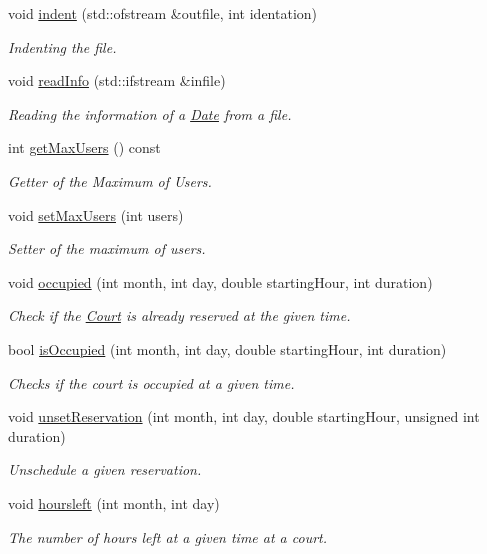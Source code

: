 \begin{DoxyCompactItemize}
void \mbox{\hyperlink{class_court_ae08f3e2f1119073fffc251fc1e725550}{indent}} (std\+::ofstream \&outfile, int identation)
\begin{DoxyCompactList}\small\item\em Indenting the file. \end{DoxyCompactList}\item 
void \mbox{\hyperlink{class_court_a2d801d3edd9d0280ef0420b131e07f2e}{read\+Info}} (std\+::ifstream \&infile)
\begin{DoxyCompactList}\small\item\em Reading the information of a \mbox{\hyperlink{class_date}{Date}} from a file. \end{DoxyCompactList}\item 
int \mbox{\hyperlink{class_court_a9992ef2a5d2ee81e8cc7f24f8c917f31}{get\+Max\+Users}} () const
\begin{DoxyCompactList}\small\item\em Getter of the Maximum of Users. \end{DoxyCompactList}\item 
void \mbox{\hyperlink{class_court_ae44417638404c3caf4579104e633a2f4}{set\+Max\+Users}} (int users)
\begin{DoxyCompactList}\small\item\em Setter of the maximum of users. \end{DoxyCompactList}\item 
void \mbox{\hyperlink{class_court_abb97f1c2df77bd02e788ac7d4709eaa8}{occupied}} (int month, int day, double starting\+Hour, int duration)
\begin{DoxyCompactList}\small\item\em Check if the \mbox{\hyperlink{class_court}{Court}} is already reserved at the given time. \end{DoxyCompactList}\item 
bool \mbox{\hyperlink{class_court_ae4536a06bcc2aec8a144d134ae64f2e6}{is\+Occupied}} (int month, int day, double starting\+Hour, int duration)
\begin{DoxyCompactList}\small\item\em Checks if the court is occupied at a given time. \end{DoxyCompactList}\item 
void \mbox{\hyperlink{class_court_a5041b8a1dd8463f4b184497a63f718f0}{unset\+Reservation}} (int month, int day, double starting\+Hour, unsigned int duration)
\begin{DoxyCompactList}\small\item\em Unschedule a given reservation. \end{DoxyCompactList}\item 
void \mbox{\hyperlink{class_court_abb67c98e97c13d7eb9e49622a2e12aff}{hoursleft}} (int month, int day)
\begin{DoxyCompactList}\small\item\em The number of hours left at a given time at a court. \end{DoxyCompactList}\end{DoxyCompactItemize}


